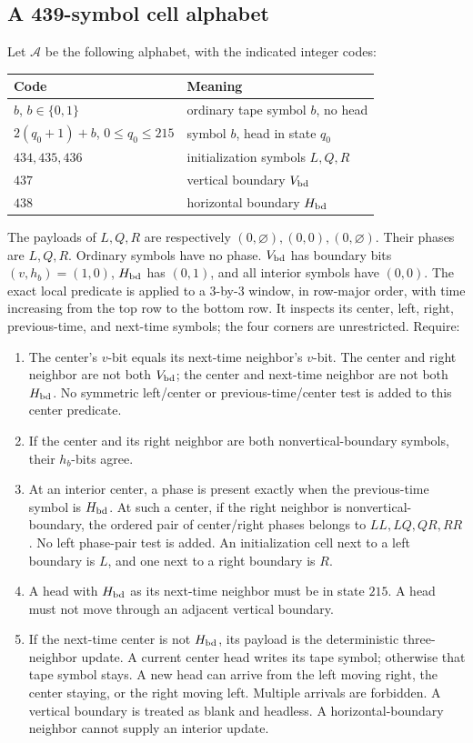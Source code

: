 \documentclass[11pt,a4paper]{article}
\theoremstyle{definition}
\theoremstyle{remark}
\begin{document}
\subsection{A 439-symbol cell alphabet}
Let \(\mathcal A\) be the following alphabet, with the indicated integer
codes:
\begin{center}
\begin{tabular}{ll}
\toprule
Code & Meaning\\
\midrule
\(b\), \(b\in\{0,1\}\) & ordinary tape symbol \(b\), no head\\
\(2(q_0+1)+b\), \(0\le q_0\le215\) & symbol \(b\), head in state \(q_0\)\\
\(434,435,436\) & initialization symbols \(L,Q,R\)\\
\(437\) & vertical boundary \(V_{\rm bd}\)\\
\(438\) & horizontal boundary \(H_{\rm bd}\)\\
\bottomrule
\end{tabular}
\end{center}
The payloads of \(L,Q,R\) are respectively
\((0,\varnothing),(0,0),(0,\varnothing)\). Their phases are \(L,Q,R\).
Ordinary symbols have no phase. \(V_{\rm bd}\) has boundary bits
\((v,h_b)=(1,0)\), \(H_{\rm bd}\) has \((0,1)\), and all interior
symbols have \((0,0)\).
The exact local predicate is applied to a \(3\)-by-\(3\) window, in
row-major order, with time increasing from the top row to the bottom
row. It inspects its center, left, right, previous-time, and next-time
symbols; the four corners are unrestricted. Require:
\begin{enumerate}
\item The center's \(v\)-bit equals its next-time neighbor's \(v\)-bit.
The center and right neighbor are not both \(V_{\rm bd}\);
the center and next-time neighbor are not both \(H_{\rm bd}\).
No symmetric left/center or previous-time/center test is added
to this center predicate.
\item If the center and its right neighbor are both nonvertical-boundary
symbols, their \(h_b\)-bits agree.
\item At an interior center, a phase is present exactly when the
previous-time symbol is \(H_{\rm bd}\). At such a center, if the right
neighbor is nonvertical-boundary, the ordered pair of center/right
phases belongs to \(LL,LQ,QR,RR\). No left phase-pair test is added.
An initialization cell next to a left boundary is \(L\), and one
next to a right boundary is \(R\).
\item A head with \(H_{\rm bd}\) as its next-time neighbor must be in
state \(215\). A head must not move through an adjacent vertical boundary.
\item If the next-time center is not \(H_{\rm bd}\), its payload is
the deterministic three-neighbor update. A current center head writes
its tape symbol; otherwise that tape symbol stays. A new head can arrive
from the left moving right, the center staying, or the right moving
left. Multiple arrivals are forbidden. A vertical boundary is treated
as blank and headless. A horizontal-boundary neighbor cannot supply an
interior update.
\end{enumerate}
\end{document}
